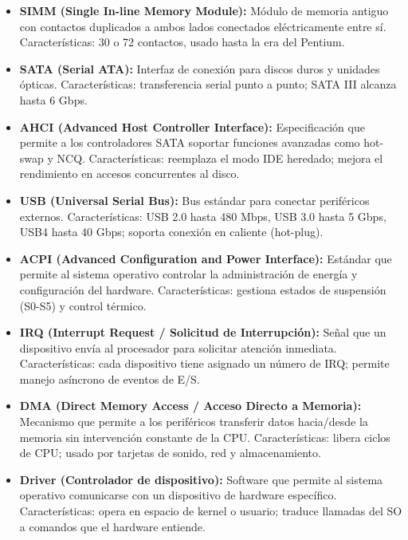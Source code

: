 \documentclass[10pt]{article}
\begin{document}
\begin{itemize}
    \item \textbf{SIMM (Single In-line Memory Module):} Módulo de memoria antiguo con contactos duplicados a ambos lados conectados eléctricamente entre sí. Características: 30 o 72 contactos, usado hasta la era del Pentium.

    \item \textbf{SATA (Serial ATA):} Interfaz de conexión para discos duros y unidades ópticas. Características: transferencia serial punto a punto; SATA III alcanza hasta 6 Gbps.

    \item \textbf{AHCI (Advanced Host Controller Interface):} Especificación que permite a los controladores SATA soportar funciones avanzadas como hot-swap y NCQ. Características: reemplaza el modo IDE heredado; mejora el rendimiento en accesos concurrentes al disco.

    \item \textbf{USB (Universal Serial Bus):} Bus estándar para conectar periféricos externos. Características: USB 2.0 hasta 480 Mbps, USB 3.0 hasta 5 Gbps, USB4 hasta 40 Gbps; soporta conexión en caliente (hot-plug).

    \item \textbf{ACPI (Advanced Configuration and Power Interface):} Estándar que permite al sistema operativo controlar la administración de energía y configuración del hardware. Características: gestiona estados de suspensión (S0-S5) y control térmico.

    \item \textbf{IRQ (Interrupt Request / Solicitud de Interrupción):} Señal que un dispositivo envía al procesador para solicitar atención inmediata. Características: cada dispositivo tiene asignado un número de IRQ; permite manejo asíncrono de eventos de E/S.

    \item \textbf{DMA (Direct Memory Access / Acceso Directo a Memoria):} Mecanismo que permite a los periféricos transferir datos hacia/desde la memoria sin intervención constante de la CPU. Características: libera ciclos de CPU; usado por tarjetas de sonido, red y almacenamiento.

    \item \textbf{Driver (Controlador de dispositivo):} Software que permite al sistema operativo comunicarse con un dispositivo de hardware específico. Características: opera en espacio de kernel o usuario; traduce llamadas del SO a comandos que el hardware entiende.


\end{itemize}
\end{document}
